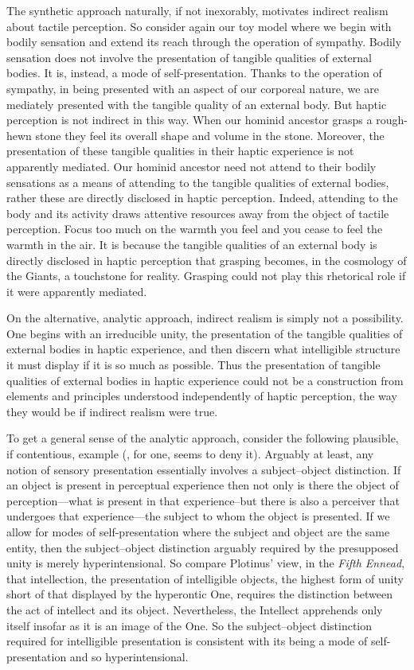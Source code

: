 The synthetic approach naturally, if not inexorably, motivates indirect realism about tactile perception. So consider again our toy model where we begin with bodily sensation and extend its reach through the operation of sympathy. Bodily sensation does not involve the presentation of tangible qualities of external bodies. It is, instead, a mode of self-presentation. Thanks to the operation of sympathy, in being presented with an aspect of our corporeal nature, we are mediately presented with the tangible quality of an external body. But haptic perception is not indirect in this way. When our hominid ancestor grasps a rough-hewn stone they feel its overall shape and volume in the stone. Moreover, the presentation of these tangible qualities in their haptic experience is not apparently mediated. Our hominid ancestor need not attend to their bodily sensations as a means of attending to the tangible qualities of external bodies, rather these are directly disclosed in haptic perception. Indeed, attending to the body and its activity draws attentive resources away from the object of tactile perception. Focus too much on the warmth you feel and you cease to feel the warmth in the air. It is because the tangible qualities of an external body is directly disclosed in haptic perception that grasping becomes, in the cosmology of the Giants, a touchstone for reality. Grasping could not play this rhetorical role if it were apparently mediated.

On the alternative, analytic approach, indirect realism is simply not a possibility. One begins with an irreducible unity, the presentation of the tangible qualities of external bodies in haptic experience, and then discern what intelligible structure it must display if it is so much as possible. Thus the presentation of tangible qualities of external bodies in haptic experience could not be a construction from elements and principles understood independently of haptic perception, the way they would be if indirect realism were true.

To get a general sense of the analytic approach, consider the following plausible, if contentious, example (\citealt{Johnston:2007qy}, for one, seems to deny it). Arguably at least, any notion of sensory presentation essentially involves a subject--object distinction. If an object is present in perceptual experience then not only is there the object of perception---what is present in that experience--but there is also a perceiver that undergoes that experience---the subject to whom the object is presented. If we allow for modes of self-presentation where the subject and object are the same entity, then the subject--object distinction arguably required by the presupposed unity is merely hyperintensional. So compare Plotinus' view, in the \emph{Fifth Ennead}, that intellection, the presentation of intelligible objects, the highest form of unity short of that displayed by the hyperontic One, requires the distinction between the act of intellect and its object. Nevertheless, the Intellect apprehends only itself insofar as it is an image of the One. So the subject--object distinction required for intelligible presentation is consistent with its being a mode of self-presentation and so hyperintensional. 

